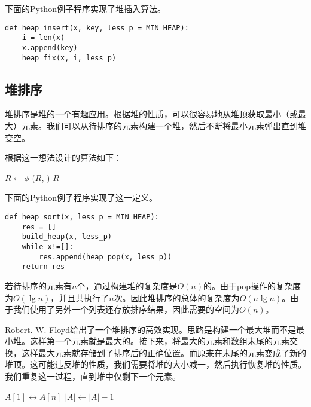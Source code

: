 \documentclass[UTF8]{article}
\begin{document}
下面的Python例子程序实现了堆插入算法。

\lstset{language=Python}
\begin{lstlisting}
def heap_insert(x, key, less_p = MIN_HEAP):
    i = len(x)
    x.append(key)
    heap_fix(x, i, less_p)
\end{lstlisting}

\subsection{堆排序}
\label{heap-sort}

堆排序是堆的一个有趣应用。根据堆的性质，可以很容易地从堆顶获取最小（或最大）元素。我们可以从待排序的元素构建一个堆，然后不断将最小元素弹出直到堆变空。

根据这一想法设计的算法如下：

\begin{algorithmic}[1]
  \State $R \gets \phi$
  \State {}
    \State {}($R$, )
  \EndWhile
  \State \Return $R$
\EndFunction
\end{algorithmic}

下面的Python例子程序实现了这一定义。

\lstset{language=Python}
\begin{lstlisting}
def heap_sort(x, less_p = MIN_HEAP):
    res = []
    build_heap(x, less_p)
    while x!=[]:
        res.append(heap_pop(x, less_p))
    return res
\end{lstlisting}

若待排序的元素有$n$个，通过构建堆的复杂度是$O(n)$的。由于pop操作的复杂度为$O(\lg n)$，并且共执行了$n$次。因此堆排序的总体的复杂度为$O(n \lg n)$。由于我们使用了另外一个列表还存放排序结果，因此需要的空间为$O(n)$。

Robert. W. Floyd给出了一个堆排序的高效实现。思路是构建一个最大堆而不是最小堆。这样第一个元素就是最大的。接下来，将最大的元素和数组末尾的元素交换，这样最大元素就存储到了排序后的正确位置。而原来在末尾的元素变成了新的堆顶。这可能违反堆的性质，我们需要将堆的大小减一，然后执行恢复堆的性质。我们重复这一过程，直到堆中仅剩下一个元素。

\begin{algorithmic}[1]
  \State {}
    \State {} $A[1] \leftrightarrow A[n]$
    \State $|A| \gets |A| - 1$
    \State {}
  \EndWhile
\EndFunction
\end{algorithmic}
\end{document}
